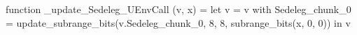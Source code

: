 function _update_Sedeleg_UEnvCall (v, x) = let v = { v with Sedeleg_chunk_0 = update_subrange_bits(v.Sedeleg_chunk_0, 8, 8, subrange_bits(x, 0, 0)) } in
  v

